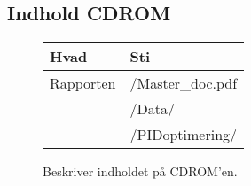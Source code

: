 \newpage

\tableofcontents
{}
\listoffigures
\listoftables  

\subsection*{Indhold CDROM}
\begin{figure}[th!]
\centering
\begin{tabular}{l|l}
Hvad&Sti\\\hline
Rapporten&/Master\_doc.pdf\\
&/Data/\\
&/PIDoptimering/\\

\end{tabular}
\captionsetup{type=table}
\caption*{Beskriver indholdet på CDROM'en.}
\label{tb:CD}
\end{figure}


\newpage
\listoftodos
